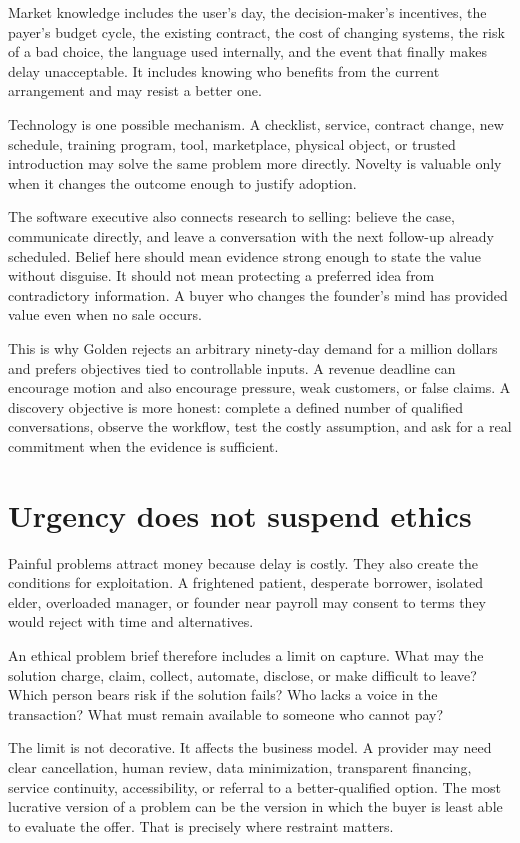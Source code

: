 Market knowledge includes the user's day, the decision-maker's incentives, the
payer's budget cycle, the existing contract, the cost of changing systems, the
risk of a bad choice, the language used internally, and the event that finally
makes delay unacceptable. It includes knowing who benefits from the current
arrangement and may resist a better one.

Technology is one possible mechanism. A checklist, service, contract change,
new schedule, training program, tool, marketplace, physical object, or trusted
introduction may solve the same problem more directly. Novelty is valuable only
when it changes the outcome enough to justify adoption.

The software executive also connects research to selling: believe the case,
communicate directly, and leave a conversation with the next follow-up already
scheduled. Belief here should mean evidence strong enough to state the value
without disguise. It should not mean protecting a preferred idea from
contradictory information. A buyer who changes the founder's mind has provided
value even when no sale occurs.

This is why Golden rejects an arbitrary ninety-day demand for a million dollars
and prefers objectives tied to controllable inputs. A revenue deadline can
encourage motion and also encourage pressure, weak customers, or false claims.
A discovery objective is more honest: complete a defined number of qualified
conversations, observe the workflow, test the costly assumption, and ask for a
real commitment when the evidence is sufficient.

\section{Urgency does not suspend ethics}

Painful problems attract money because delay is costly. They also create the
conditions for exploitation. A frightened patient, desperate borrower,
isolated elder, overloaded manager, or founder near payroll may consent to
terms they would reject with time and alternatives.

An ethical problem brief therefore includes a limit on capture. What may the
solution charge, claim, collect, automate, disclose, or make difficult to leave?
Which person bears risk if the solution fails? Who lacks a voice in the
transaction? What must remain available to someone who cannot pay?

The limit is not decorative. It affects the business model. A provider may need
clear cancellation, human review, data minimization, transparent financing,
service continuity, accessibility, or referral to a better-qualified option.
The most lucrative version of a problem can be the version in which the buyer
is least able to evaluate the offer. That is precisely where restraint matters.

